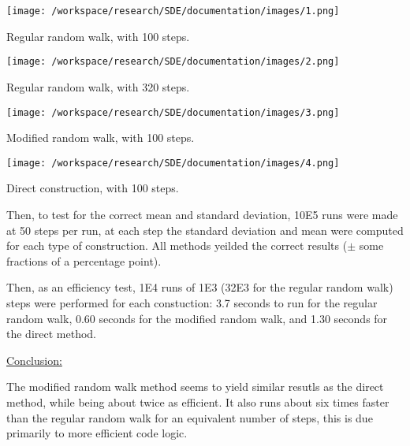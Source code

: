 \documentclass[12pt]{article}
\begin{document}
\texttt{[image: /workspace/research/SDE/documentation/images/1.png]}

Regular random walk, with 100 steps.

\texttt{[image: /workspace/research/SDE/documentation/images/2.png]}

Regular random walk, with 320 steps.

\texttt{[image: /workspace/research/SDE/documentation/images/3.png]}

Modified random walk, with 100 steps.

\texttt{[image: /workspace/research/SDE/documentation/images/4.png]}

Direct construction, with 100 steps.

\begin{flushleft}
Then, to test for the correct mean and standard deviation, 10E5 runs were made at 50 steps per run, at each step the standard deviation and mean were computed for each type of construction. All methods yeilded the correct results ($\pm$ some fractions of a percentage point).
\end{flushleft}

\begin{flushleft}
Then, as an efficiency test, 1E4 runs of 1E3 (32E3 for the regular random walk) steps were performed for each constuction: 3.7 seconds to run for the regular random walk, 0.60 seconds for the modified random walk, and 1.30 seconds for the direct method.
\end{flushleft}


\begin{flushleft}
\underline{Conclusion:}
\end{flushleft}


\begin{flushleft}
The modified random walk method seems to yield similar resutls as the direct method, while being about twice as efficient. It also runs about six times faster than the regular random walk for an equivalent number of steps, this is due primarily to more efficient code logic. 
\end{flushleft}
\end{document}
